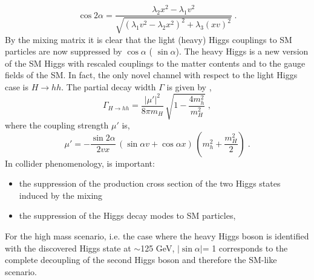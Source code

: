 \begin{equation}
\cos 2 \alpha= \frac{\lambda_2 x^2 - \lambda_1 v^2}{\sqrt{(\lambda_1 v^2 - \lambda_2 x^2)^2 +\lambda_3 (xv)^2 } } \; .  \end{equation}
\newline
By the  mixing matrix it is clear that the light (heavy) Higgs couplings to SM particles are now
suppressed by $\cos \alpha $ ( $\sin \alpha $).
The heavy Higgs is a new version of the SM Higgs with rescaled couplings
to the matter contents and to the gauge fields of the SM. In fact, the only novel channel
with respect to the light Higgs case is $H \rightarrow hh$. The partial decay width $\Gamma$ is given by \cite{Schabinger:2005ei},
\newline
\newline
 \begin{equation}
\Gamma_{ H \rightarrow hh} =  \frac{|\mu'|^2}{8 \pi m_H } \, \sqrt{1- \frac{4m_h^2}{m_H^2}}  \; , \end{equation}
\newline
where the coupling strength $\mu'$ is,
\newline
\begin{equation}
 \mu' =  - \frac{\sin 2 \alpha}{2vx} \, (\sin \alpha v + \cos \alpha x) \, (m_h^2 + \frac{m_H^2}{2})  \; . \end{equation}
\newline
In collider phenomenology, is important:
\begin{itemize}
\item the suppression of the production cross section of the two Higgs states induced by the mixing
\item the suppression of the Higgs decay modes to SM particles,
\end{itemize}
For the high mass  scenario, i.e. the case where the heavy Higgs boson is identified with the discovered Higgs state at $\sim$125 GeV, $|\sin \alpha| $= 1 corresponds to the complete decoupling of the second Higgs boson and therefore the SM-like scenario.


